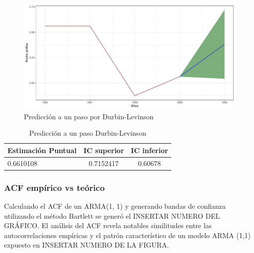 \documentclass[
  letterpaper,
  DIV=11,
  numbers=noendperiod,
  twocolumn]{scrartcl}
\begin{document}
\begin{figure}[H]

{\centering \includegraphics{pdf_tarea2_files/figure-pdf/fig-exp8-1.pdf}

}

\caption{\label{fig-exp8}Predicción a un paso por Durbin-Levinson}

\end{figure}

\begin{table}[H]
  \centering
  \caption{Predicción a un paso Durbin-Levinson}
  \begin{tabular}{lcc}
    \toprule
    Estimación Puntual & IC superior & IC inferior \\
    \midrule
    0.6610108 & 0.7152417 & 0.60678 \\
    \bottomrule
  \end{tabular}
  
\end{table}

\hypertarget{acf-empuxedrico-vs-teuxf3rico}{%
\subsubsection{ACF empírico vs
teórico}\label{acf-empuxedrico-vs-teuxf3rico}}

Calculando el ACF de un ARMA(1, 1) y generando bandas de confianza
utilizando el método Bartlett se generó el INSERTAR NUMERO DEL GRÁFICO.
El análisis del ACF revela notables similitudes entre las
autocorrelaciones empíricas y el patrón característico de un modelo ARMA
(1,1) expuesto en INSERTAR NUMERO DE LA FIGURA.
\end{document}
